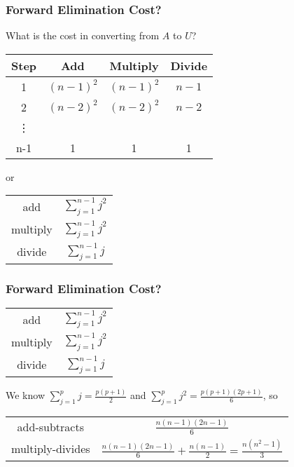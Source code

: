 \documentclass[10pt]{beamer}
\begin{document}
\begin{frame}
\frametitle{Forward Elimination Cost?}
What is the cost in converting from $A$ to $U$?
\begin{center}
\begin{tabular}{c c c c}\hline
Step & Add & Multiply & Divide\\\hline
1 & $(n-1)^2$ & $(n-1)^2$ & $n-1$\\
2 & $(n-2)^2$ & $(n-2)^2$ & $n-2$\\
\vdots & & & \\
n-1 & 1 & 1 & 1\\\hline
\end{tabular}
\end{center}
or
\begin{center}
\begin{tabular}{c c}\hline
add & $\sum_{j=1}^{n-1} j^2$ \\
multiply & $\sum_{j=1}^{n-1} j^2$ \\
divide & $\sum_{j=1}^{n-1} j$ \\\hline
\end{tabular}
\end{center}

\end{frame}
\begin{frame}
\frametitle{Forward Elimination Cost?}
\begin{center}
\begin{tabular}{c c}\hline
add & $\sum_{j=1}^{n-1} j^2$ \\
multiply & $\sum_{j=1}^{n-1} j^2$ \\
divide & $\sum_{j=1}^{n-1} j$ \\\hline
\end{tabular}
\vspace{1cm}
\end{center}
We know $\sum_{j=1}^{p} j = \frac{p(p+1)}{2}$ and
$\sum_{j=1}^{p} j^2= \frac{p(p+1)(2p+1)}{6}$, so
\vspace{1cm}
\begin{center}
\begin{tabular}{c c}\hline
add-subtracts & $\frac{n(n-1)(2n-1)}{6}$\\
multiply-divides & $\frac{n(n-1)(2n-1)}{6} +
\frac{n(n-1)}{2}=\frac{n(n^2 - 1)}{3}$\\\hline
\end{tabular}
\end{center}

\end{frame}
\end{document}
